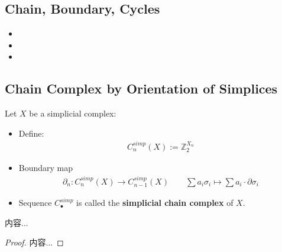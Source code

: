 \documentclass[Total.tex]{subfiles}
\begin{document}
				\subsection{Chain, Boundary, Cycles}
					\begin{Def}
						\begin{itemize}
							\item 
							\item 
							\item 
						\end{itemize}
					\end{Def}
				\subsection{Chain Complex by Orientation of Simplices}
					\begin{Def} Let $X$ be a simplicial complex:
						\begin{itemize}
							\item Define:
							\begin{gather*}
								C^{simp}_n(X):=\mathbb{Z}_2^{X_n}
							\end{gather*}
							\item Boundary map
							\begin{gather*}
								\partial_n:C^{simp}_n(X)\rightarrow C_{n-1}^{simp}(X)\qquad \sum a_i\sigma_i\mapsto \sum a_i\cdot \partial\sigma_i
							\end{gather*}
							\item Sequence $C^{simp}_\bullet$ is called the \textbf{simplicial chain complex} of $X$.
						\end{itemize}
					\end{Def}
					
					\begin{proposition}
						内容...
					\end{proposition}
					\begin{proof}
						内容...
					\end{proof}
\end{document}
